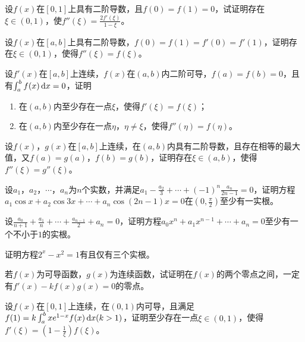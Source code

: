 \begin{example}
	设$f(x)$在$[0,1]$上具有二阶导数，且$f(0)=f(1)=0$，试证明存在$\xi\in(0,1)$，使$f''(\xi)=\frac{2f'(\xi)}{1-\xi}$。
\end{example}

\begin{example}
	设$f(x)$在$[a,b]$上具有二阶导数，$f(0)=f(1)=f'(0)=f'(1)$，证明存在$\xi\in(0,1)$，使得$f''(\xi)=f(\xi)$。
\end{example}

\begin{example}
	设$f'(x)$在$[a,b]$上连续，$f(x)$在$(a,b)$内二阶可导，$f(a)=f(b)=0$，且有$\int_{a}^{b}f(x)\,\mathrm{d} x=0$，证明
	\begin{enumerate}
		\item 在$(a,b)$内至少存在一点$\xi$，使得$f'(\xi)=f(\xi)$；
		\item 在$(a,b)$内至少存在一点$\eta$，$\eta\neq\xi$，使得$f''(\eta)=f(\eta)$。
	\end{enumerate}
\end{example}

\begin{example}
	设$f(x)$，$g(x)$在$[a,b]$上连续，在$(a,b)$内具有二阶导数，且存在相等的最大值，又$f(a)=g(a)$，$f(b)=g(b)$，证明存在$\xi\in(a,b)$，使得$f''(\xi)=g''(\xi)$。
\end{example}

\begin{example}
	设$a_1$，$a_2$，$\cdots$，$a_n$为$n$个实数，并满足$a_1-\frac{a_2}{3}+\cdots+(-1)^n\frac{a_n}{2n-1}=0$，证明方程$a_1\cos x+a_2\cos 3x+\cdots+a_n\cos (2n-1)x=0$在$(0,\frac{\pi}{2})$至少有一实根。
\end{example}

\begin{example}
	设$\frac{a_0}{n+1}+\frac{a_1}{n}+\cdots+\frac{a_{n-1}}{2}+a_n=0$，证明方程$a_0x^n+a_1x^{n-1}+\cdots+a_n=0$至少有一个不小于$1$的实根。
\end{example}

\begin{example}
	证明方程$2^x-x^2=1$有且仅有三个实根。
\end{example}

\begin{example}
	若$f(x)$为可导函数，$g(x)$为连续函数，试证明在$f(x)$的两个零点之间，一定有$f'(x)-kf(x)g(x)=0$的零点。
\end{example}

\begin{example}
	设$f(x)$在$[0,1]$上连续，在$(0,1)$内可导，且满足$f(1)=k\int_{a}^{b}xe^{1-x}f(x)\,\mathrm{d} x(k>1)$，证明至少存在一点$\xi\in(0,1)$，使得$f'(\xi)=(1-\frac{1}{\xi})f(\xi)$。
\end{example}


